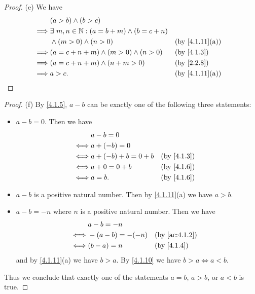 \begin{proof}{(e)}
  We have
  \begin{align*}
             & (a > b) \land (b > c)                                                                  \\
    \implies & \exists\ m, n \in \N : (a = b + m) \land (b = c + n)                                   \\
             & \land (m > 0) \land (n > 0)                          &  & \text{(by \cref{4.1.11}(a))} \\
    \implies & (a = c + n + m) \land (m > 0) \land (n > 0)          &  & \by{4.1.3}                   \\
    \implies & (a = c + n + m) \land (n + m > 0)                    &  & \by{2.2.8}                   \\
    \implies & a > c.                                               &  & \text{(by \cref{4.1.11}(a))}
  \end{align*}
\end{proof}

\begin{proof}{(f)}
  By \cref{4.1.5}, \(a - b\) can be exactly one of the following three statements:
  \begin{itemize}
    \item \(a - b = 0\).
          Then we have
          \begin{align*}
                 & a - b = 0                            \\
            \iff & a + (-b) = 0                         \\
            \iff & a + (-b) + b = 0 + b &  & \by{4.1.3} \\
            \iff & a + 0 = 0 + b        &  & \by{4.1.6} \\
            \iff & a = b.               &  & \by{4.1.6}
          \end{align*}
    \item \(a - b\) is a positive natural number.
          Then by \cref{4.1.11}(a) we have \(a > b\).
    \item \(a - b = -n\) where \(n\) is a positive natural number.
          Then we have
          \begin{align*}
                 & a - b = -n                                        \\
            \iff & -(a - b) = -(-n) &  & \text{(by \cref{ac:4.1.2})} \\
            \iff & (b - a) = n      &  & \by{4.1.4}
          \end{align*}
          and by \cref{4.1.11}(a) we have \(b > a\).
          By \cref{4.1.10} we have \(b > a \iff a < b\).
  \end{itemize}
  Thus we conclude that exactly one of the statements \(a = b\), \(a > b\), or \(a < b\) is true.
\end{proof}

